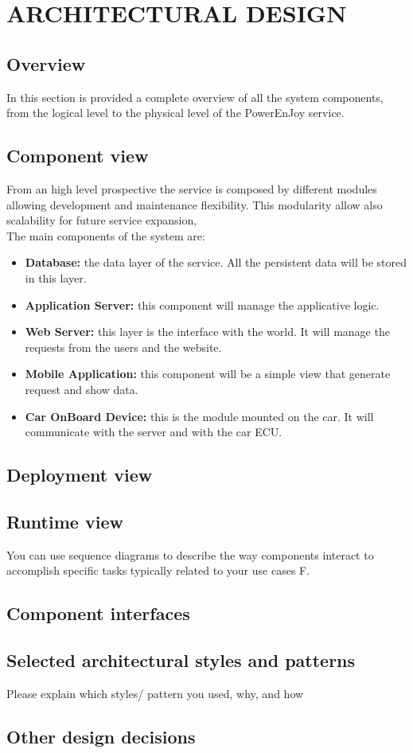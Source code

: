 \section{ARCHITECTURAL DESIGN}
\subsection{Overview}
In this section is provided a complete overview of all the system components, from the logical level to the physical level of the PowerEnJoy service.

\subsection{Component view} 
From an high level prospective the service is composed by different modules allowing development and maintenance flexibility.
This modularity allow also scalability for future service expansion, 
\\The main components of the system are:
\begin{itemize}
\item{\textbf{Database:}} the data layer of the service. All the persistent data will be stored in this layer.
\item{\textbf{Application Server:}} this component will manage the applicative logic.
\item{\textbf{Web Server:}} this layer is the interface with the world. It will manage the requests from the users and the website.
\item{\textbf{Mobile Application:}} this component will be a simple view that generate request and show data. 
\item{\textbf{Car OnBoard Device:}} this is the module mounted on the car. It will communicate with the server and with the car ECU.
\end{itemize}



\subsection{Deployment view}
\subsection{Runtime view}
You can use sequence diagrams to describe the way components interact to accomplish specific tasks typically related to your use cases F. 
\subsection{Component interfaces} 
\subsection{Selected architectural styles and patterns}
Please explain which styles/ pattern you used, why, and how
\subsection{Other design decisions }
